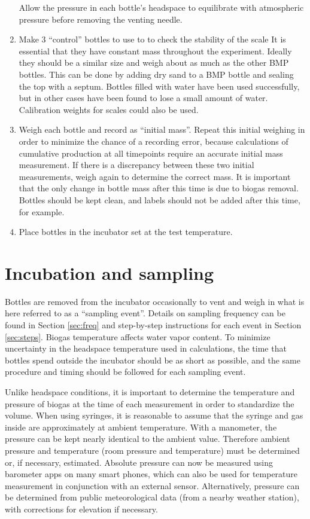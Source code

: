 \documentclass[]{article}
\begin{document}
\begin{enumerate}
      Allow the pressure in each bottle’s headspace to equilibrate with atmospheric pressure before removing the venting needle.
    \item Make 3 ``control'' bottles to use to to check the stability of the scale
      It is essential that they have constant mass throughout the experiment. 
      Ideally they should be a similar size and weigh about as much as the other BMP bottles.
      This can be done by adding dry sand to a BMP bottle and sealing the top with a septum. 
      Bottles filled with water have been used successfully, but in other cases have been found to lose a small amount of water.  
      Calibration weights for scales could also be used.
    \item Weigh each bottle and record as ``initial mass''. 
      Repeat this initial weighing in order to minimize the chance of a recording error, because calculations of cumulative  production at all timepoints require an accurate initial mass measurement.
      If there is a discrepancy between these two initial measurements, weigh again to determine the correct mass.
      It is important that the only change in bottle mass after this time is due to biogas removal.
      Bottles should be kept clean, and labels should not be added after this time, for example.
    \item Place bottles in the incubator set at the test temperature.
\end{enumerate}

\section{Incubation and sampling}
\label{sec:incsam}
Bottles are removed from the incubator occasionally to vent and weigh in what is here referred to as a ``sampling event''.
Details on sampling frequency can be found in Section \ref{sec:freq} and step-by-step instructions for each event in Section \ref{sec:steps}.
Biogas temperature affects water vapor content. 
To minimize uncertainty in the headspace temperature used in calculations, the time that bottles spend outside the incubator should be as short as possible, and the same procedure and timing should be followed for each sampling event. 

Unlike headspace conditions, it is important to determine the temperature and pressure of biogas at the time of each measurement in order to standardize the volume.
When using syringes, it is reasonable to assume that the syringe and gas inside are approximately at ambient temperature.
With a manometer, the pressure can be kept nearly identical to the ambient value.
Therefore ambient pressure and temperature (room pressure and temperature) must be determined or, if necessary, estimated.
Absolute pressure can now be measured using barometer apps on many smart phones, which can also be used for temperature measurement in conjunction with an external sensor.
Alternatively, pressure can be determined from public meteorological data (from a nearby weather station), with corrections for elevation if necessary.
\end{document}
